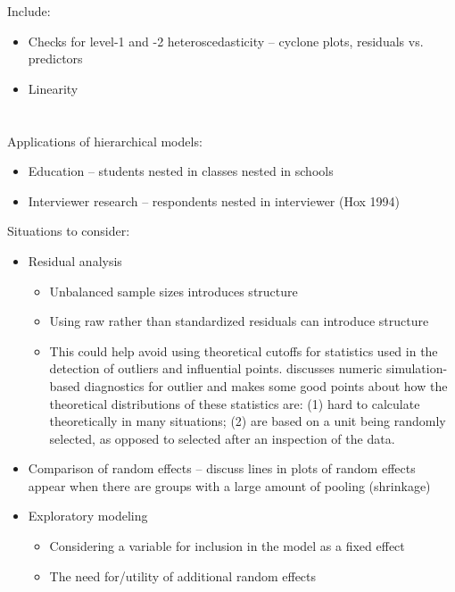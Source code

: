 \documentclass{article} %
\begin{document}
Include:
\begin{itemize}
\item Checks for level-1 and -2 heteroscedasticity -- cyclone plots, residuals vs. predictors
\item Linearity

\end{itemize}


\section{}
Applications of hierarchical models:
\begin{itemize}
\item Education -- students nested in classes nested in schools
\item Interviewer research -- respondents nested in interviewer (Hox 1994)
\end{itemize}

Situations to consider:
\begin{itemize}
\item Residual analysis
	\begin{itemize}
	\item Unbalanced sample sizes introduces structure
	\item Using raw rather than standardized residuals can introduce structure
	\item This could help avoid using theoretical cutoffs for statistics used in the detection of outliers and influential points. \cite{Longford:2001wy} discusses numeric simulation-based diagnostics for outlier and makes some good points about how the theoretical distributions of these statistics are: (1) hard to calculate theoretically in many situations; (2) are based on a unit being randomly selected, as opposed to selected after an inspection of the data.
	\end{itemize}

\item Comparison of random effects -- \cite{Morrell:2000ve} discuss lines in plots of random effects appear when there are groups with a large amount of pooling (shrinkage)

\item Exploratory modeling
	\begin{itemize}
	\item Considering a variable for inclusion in the model as a fixed effect
	\item The need for/utility of additional random effects
	
	\end{itemize}


\end{itemize}
\end{document}
